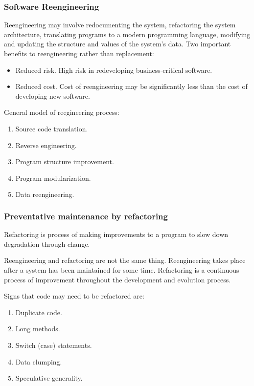 \documentclass{article}
\begin{document}
\subsubsection{Software Reengineering}
Reengineering may involve redocumenting the system, refactoring the system architecture, translating programs to a modern programming language, modifying and updating the structure and values of the system's data.
Two important benefits to reengineering rather than replacement:
\begin{itemize}
    \item Reduced risk.  High risk in redeveloping business-critical software.
    \item Reduced cost.  Cost of reengineering may be significantly less than the cost of developing new software.
\end{itemize}
General model of reegineering process:
\begin{enumerate}
    \item Source code translation.
    \item Reverse engineering.
    \item Program structure improvement.
    \item Program modularization.
    \item Data reengineering.
\end{enumerate}

\subsubsection{Preventative maintenance by refactoring}
Refactoring is process of making improvements to a program to slow down degradation through change.

Reengineering and refactoring are not the same thing.  Reengineering takes place after a system has been maintained for some time.  Refactoring is a continuous process of improvement throughout the development and evolution process.

Signs that code may need to be refactored are:
\begin{enumerate}
    \item Duplicate code.
    \item Long methods.
    \item Switch (case) statements.
    \item Data clumping.
    \item Speculative generality.
\end{enumerate}
\end{document}
